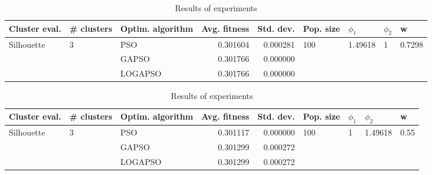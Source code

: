 \documentclass{article}
\begin{document}
\begin{table}
\centering
\caption{Results of experiments}
\begin{tabular}{lllrrllll}
\toprule
              Cluster eval. &        \# clusters & Optim. algorithm &  Avg. fitness &  Std. dev. &            Pop. size &               $\phi_{1}$ &         $\phi_{2}$ &                       w \\
\midrule
\multirow{3}{*}{Silhouette} & \multirow{3}{*}{3} &              PSO &      0.301604 &   0.000281 & \multirow{3}{*}{100} & \multirow{3}{*}{1.49618} & \multirow{3}{*}{1} & \multirow{3}{*}{0.7298} \\
                            &                    &            GAPSO &      0.301766 &   0.000000 &                      &                          &                    &                         \\
                            &                    &          LOGAPSO &      0.301766 &   0.000000 &                      &                          &                    &                         \\
\bottomrule
\end{tabular}
\end{table}
\begin{table}
\centering
\caption{Results of experiments}
\begin{tabular}{lllrrllll}
\toprule
              Cluster eval. &        \# clusters & Optim. algorithm &  Avg. fitness &  Std. dev. &            Pop. size &         $\phi_{1}$ &               $\phi_{2}$ &                     w \\
\midrule
\multirow{3}{*}{Silhouette} & \multirow{3}{*}{3} &              PSO &      0.301117 &   0.000000 & \multirow{3}{*}{100} & \multirow{3}{*}{1} & \multirow{3}{*}{1.49618} & \multirow{3}{*}{0.55} \\
                            &                    &            GAPSO &      0.301299 &   0.000272 &                      &                    &                          &                       \\
                            &                    &          LOGAPSO &      0.301299 &   0.000272 &                      &                    &                          &                       \\
\bottomrule
\end{tabular}
\end{table}
\end{document}
